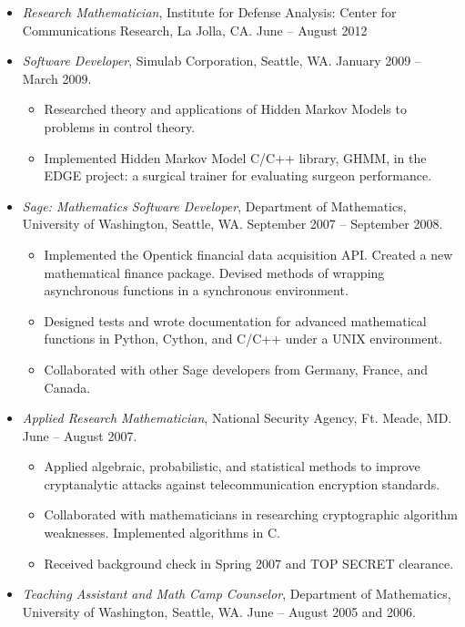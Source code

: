\documentclass{article}
\begin{document}
\begin{itemize}
  \item {\it Research Mathematician}, Institute for Defense Analysis:
    Center for Communications Research, La Jolla, CA. June – August 2012
  \item {\it Software Developer}, Simulab Corporation, Seattle,
    WA. January 2009 -- March 2009.
    \begin{itemize}
      \item Researched theory and applications of Hidden Markov Models
        to problems in control theory.
      \item Implemented Hidden Markov Model C/C++ library, GHMM, in
        the EDGE project: a surgical trainer for evaluating surgeon
        performance.
    \end{itemize}
  \item {\it Sage: Mathematics Software Developer}, Department of
    Mathematics, University of Washington, Seattle, WA. September 2007
    -- September 2008.
    \begin{itemize}
      \item Implemented the Opentick financial data acquisition
        API. Created a new mathematical finance package. Devised
        methods of wrapping asynchronous functions in a synchronous
        environment.
      \item Designed tests and wrote documentation for advanced
        mathematical functions in Python, Cython, and C/C++ under a
        UNIX environment.
      \item Collaborated with other Sage developers from Germany,
        France, and Canada.
    \end{itemize}
  \item {\it Applied Research Mathematician}, National Security Agency,
    Ft. Meade, MD. June -- August 2007.
    \begin{itemize}
      \item Applied algebraic, probabilistic, and statistical methods
        to improve cryptanalytic attacks against telecommunication
        encryption standards.
      \item Collaborated with mathematicians in researching
        cryptographic algorithm weaknesses. Implemented algorithms in
        C.
      \item Received background check in Spring 2007 and TOP SECRET
        clearance.
    \end{itemize}
  \item {\it Teaching Assistant and Math Camp Counselor}, Department of
    Mathematics, University of Washington, Seattle, WA. June -- August
    2005 and 2006.
\end{itemize}
\end{document}

